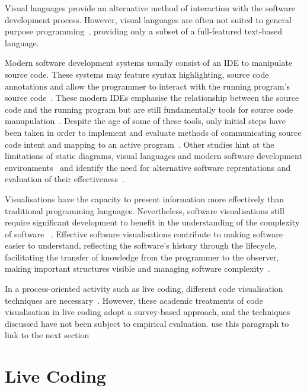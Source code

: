 Visual languages provide an alternative method of interaction with the software development process. However, visual languages are often not suited to general purpose programming~\cite{Myers1989}, providing only a subset of a full-featured text-based language.

Modern software development systems usually consist of an \ac{IDE} to manipulate source code. These systems may feature syntax highlighting, source code annotations and allow the programmer to interact with the running program's source code~. These modern \acp{IDE} emphasise the relationship between the source code and the running program but are still fundamentally tools for source code manupulation~. Despite the age of some of these tools, only initial steps have been taken in order to implement and evaluate methods of communicating source code intent and mapping to an active program~. Other studies hint at the limitations of static diagrams, visual languages and modern software development environments~ and identify the need for alternative software reprentations and evaluation of their effectiveness~. 

Visualisations have the capacity to present information more effectively than traditional programming languages. Nevertheless, software visualisations still require significant development to benefit in the understanding of the complexity of software ~\cite{Baecker1995}. Effective software visualisations contribute to making software easier to understand, reflecting the software's history through the lifecycle, facilitating the transfer of knowledge from the programmer to the observer, making important structures visible and managing software complexity~\cite{Baecker1995}.


In a process-oriented activity such as live coding, different code visualisation techniques are necessary~\cite{McLean2010a,Magnusson2013}. However, these academic treatments of code visualisation in live coding adopt a survey-based approach, and the techniques discussed have not been subject to empirical evaluation. {\color{red} use this paragraph to link to the next section}

\section{Live Coding}


